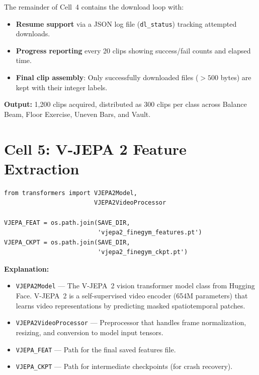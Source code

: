 \documentclass[a4paper, 12pt]{article}
\newenvironment{explanation}{%
  \par\smallskip
  \noindent\textcolor{blue!70!black}{\textbf{Explanation:}}\\
  \noindent
}{\par\medskip}
\begin{document}
The remainder of Cell~4 contains the download loop with:
\begin{itemize}[nosep]
  \item \textbf{Resume support} via a JSON log file (\texttt{dl\_status}) tracking attempted downloads.
  \item \textbf{Progress reporting} every 20 clips showing success/fail counts and elapsed time.
  \item \textbf{Final clip assembly}: Only successfully downloaded files ($>500$ bytes) are kept with their integer labels.
\end{itemize}

\textbf{Output:} 1,200 clips acquired, distributed as 300 clips per class across Balance Beam, Floor Exercise, Uneven Bars, and Vault.

\newpage
\section{Cell 5: V-JEPA 2 Feature Extraction}

\begin{lstlisting}
from transformers import VJEPA2Model,
                         VJEPA2VideoProcessor

VJEPA_FEAT = os.path.join(SAVE_DIR,
                          'vjepa2_finegym_features.pt')
VJEPA_CKPT = os.path.join(SAVE_DIR,
                          'vjepa2_finegym_ckpt.pt')
\end{lstlisting}

\begin{explanation}
\begin{itemize}[nosep]
  \item \texttt{VJEPA2Model} --- The V-JEPA~2 vision transformer model class from Hugging Face. V-JEPA~2 is a self-supervised video encoder (654M parameters) that learns video representations by predicting masked spatiotemporal patches.
  \item \texttt{VJEPA2VideoProcessor} --- Preprocessor that handles frame normalization, resizing, and conversion to model input tensors.
  \item \texttt{VJEPA\_FEAT} --- Path for the final saved features file.
  \item \texttt{VJEPA\_CKPT} --- Path for intermediate checkpoints (for crash recovery).
\end{itemize}
\end{explanation}
\end{document}
